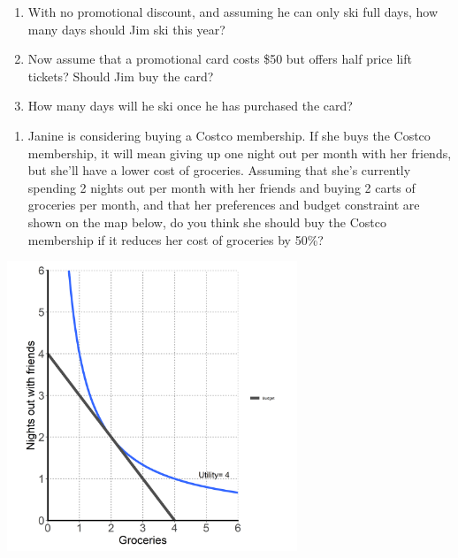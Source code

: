 \documentclass[11pt,]{article}
\providecommand{\tightlist}{%
  \setlength{\itemsep}{0pt}\setlength{\parskip}{0pt}}
\begin{document}
\begin{enumerate}
\def\labelenumi{\alph{enumi})}
\item
  With no promotional discount, and assuming he can only ski full days,
  how many days should Jim ski this year?
\item
  Now assume that a promotional card costs \$50 but offers half price
  lift tickets? Should Jim buy the card?
\item
  How many days will he ski once he has purchased the card?
\end{enumerate}

\newpage

\begin{enumerate}
\def\labelenumi{\arabic{enumi}.}
\setcounter{enumi}{1}
\tightlist
\item
  Janine is considering buying a Costco membership. If she buys the
  Costco membership, it will mean giving up one night out per month with
  her friends, but she'll have a lower cost of groceries. Assuming that
  she's currently spending 2 nights out per month with her friends and
  buying 2 carts of groceries per month, and that her preferences and
  budget constraint are shown on the map below, do you think she should
  buy the Costco membership if it reduces her cost of groceries by 50\%?
\end{enumerate}

\begin{center}
\includegraphics[width=0.65\textwidth]{../images/utils_costco.png}
\end{center}
\end{document}
